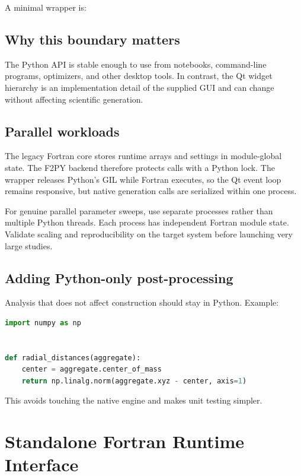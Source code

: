 \documentclass[11pt,oneside]{report}
\begin{document}
A minimal wrapper is:



\section{Why this boundary matters}

The Python API is stable enough to use from notebooks, command-line programs,
optimizers, and other desktop tools. In contrast, the Qt widget hierarchy is an
implementation detail of the supplied GUI and can change without affecting
scientific generation.

\section{Parallel workloads}

The legacy Fortran core stores runtime arrays and settings in module-global
state. The F2PY backend therefore protects calls with a Python lock. The wrapper
releases Python's GIL while Fortran executes, so the Qt event loop remains
responsive, but native generation calls are serialized within one process.

For genuine parallel parameter sweeps, use separate processes rather than
multiple Python threads. Each process has independent Fortran module state.
Validate scaling and reproducibility on the target system before launching very
large studies.

\section{Adding Python-only post-processing}

Analysis that does not affect construction should stay in Python. Example:

\begin{lstlisting}[language=Python]
import numpy as np


def radial_distances(aggregate):
    center = aggregate.center_of_mass
    return np.linalg.norm(aggregate.xyz - center, axis=1)
\end{lstlisting}

This avoids touching the native engine and makes unit testing simpler.

\chapter{Standalone Fortran Runtime Interface}
\end{document}
